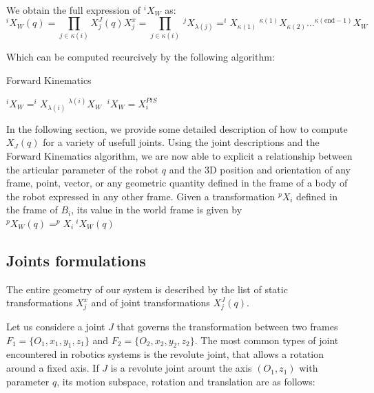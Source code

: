 We obtain the full expression of $^iX_W$ as:
\begin{equation}
  ^iX_W(q) = \prod_{j\in\kappa(i)}X^J_j(q) X^x_j = \prod_{j\in\kappa(i)}\ ^jX_{\lambda(j)}
  = ^iX_{\kappa(1)}\ ^{\kappa(1)}X_{\kappa(2)} \dots ^{\kappa(\text{end}-1)}X_{W}
\end{equation}

Which can be computed recurcively by the following algorithm:

\begin{algorithm}
  \caption{Forward Kinematics}
  \label{FK}
\begin{algorithmic}
   $^iX_W = ^iX_{\lambda(i)}\ ^{\lambda(i)}X_W$
  \Else $\ ^iX_W = X^{PtS}_i$
  \EndIf
  \EndFor
\end{algorithmic}
\end{algorithm}

In the following section, we provide some detailed description of how to compute $X_J(q)$ for a variety of usefull joints.
Using the joint descriptions and the Forward Kinematics algorithm, we are now able to explicit a relationship between the articular parameter of the robot $q$ and the 3D position and orientation of any frame, point, vector, or any geometric quantity defined in the frame of a body of the robot expressed in any other frame.
Given a transformation $^pX_i$ defined in the frame of $B_i$, its value in the world frame is given by $^pX_W(q) = ^pX_i\ ^iX_W(q)$

\subsection{Joints formulations}
\label{sub:joints_formulations}

The entire geometry of our system is described by the list of static transformations $X^x_j$ and of joint transformations $X^J_j(q)$.

Let us considere a joint $J$ that governs the transformation between two frames $F_1=\{O_1, x_1, y_1, z_1\}$ and $F_2=\{O_2, x_2, y_2, z_2\}$.
The most common types of joint encountered in robotics systems is the revolute joint, that allows a rotation around a fixed axis.
If $J$ is a revolute joint arount the axis $(O_1,z_1)$ with parameter $q$, its motion subspace, rotation and translation are as follows:

